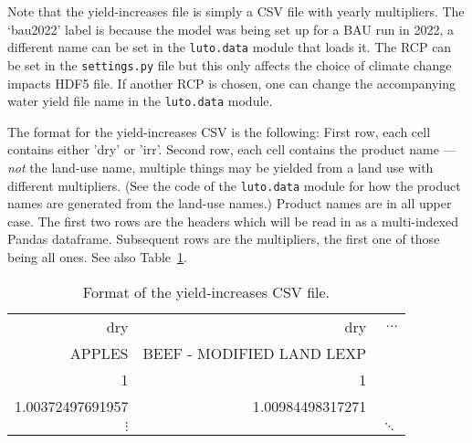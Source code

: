\documentclass[12pt,a4paper,twoside]{article}
\begin{document}
Note that the yield-increases file is simply a CSV file with yearly multipliers. The `bau2022' label is because the model was being set up for a BAU run in 2022, a different name can be set in the \texttt{luto.data} module that loads it. The RCP can be set in the \texttt{settings.py} file but this only affects the choice of climate change impacts HDF5 file. If another RCP is chosen, one can change the accompanying water yield file name in the \texttt{luto.data} module.

The format for the yield-increases CSV is the following: First row, each cell contains either 'dry' or 'irr'. Second row, each cell contains the product name --- \emph{not} the land-use name, multiple things may be yielded from a land use with different multipliers. (See the code of the \texttt{luto.data} module for how the product names are generated from the land-use names.) Product names are in all upper case. The first two rows are the headers which will be read in as a multi-indexed Pandas dataframe. Subsequent rows are the multipliers, the first one of those being all ones. See also Table~\ref{tab:yieldincreases}.

\begin{table}
\centering
\begin{tabular}{rrr}
dry    & dry                        & $\ldots$ \\
APPLES & BEEF - MODIFIED LAND LEXP  & \\
1      & 1                          & \\
1.00372497691957 & 1.00984498317271 & \\
$\vdots$      &                       & $\ddots$
\end{tabular}
\caption{Format of the yield-increases CSV file.}
\label{tab:yieldincreases}
\end{table}
\end{document}

